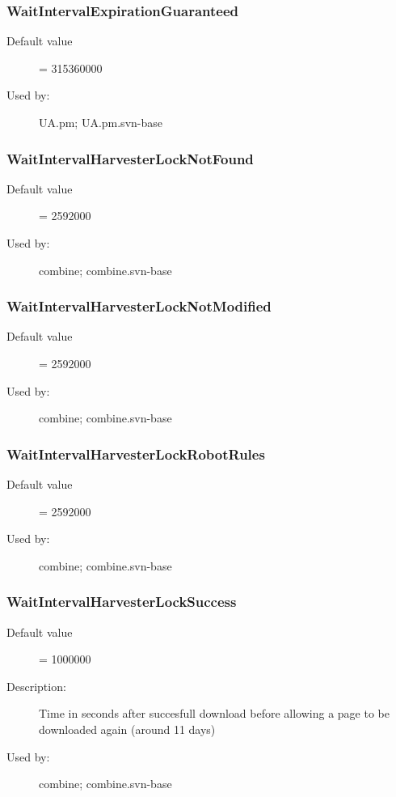\subsubsection{WaitIntervalExpirationGuaranteed}
\label{WaitIntervalExpirationGuaranteed}
\begin{description}
\item[Default value] = 315360000
\item[Used by:] UA.pm; UA.pm.svn-base
\end{description}
\subsubsection{WaitIntervalHarvesterLockNotFound}
\label{WaitIntervalHarvesterLockNotFound}
\begin{description}
\item[Default value] = 2592000
\item[Used by:] combine; combine.svn-base
\end{description}
\subsubsection{WaitIntervalHarvesterLockNotModified}
\label{WaitIntervalHarvesterLockNotModified}
\begin{description}
\item[Default value] = 2592000
\item[Used by:] combine; combine.svn-base
\end{description}
\subsubsection{WaitIntervalHarvesterLockRobotRules}
\label{WaitIntervalHarvesterLockRobotRules}
\begin{description}
\item[Default value] = 2592000
\item[Used by:] combine; combine.svn-base
\end{description}
\subsubsection{WaitIntervalHarvesterLockSuccess}
\label{WaitIntervalHarvesterLockSuccess}
\begin{description}
\item[Default value] = 1000000
\item[Description:] Time in seconds after succesfull download before allowing a page to be downloaded again (around 11 days)
\item[Used by:] combine; combine.svn-base
\end{description}
